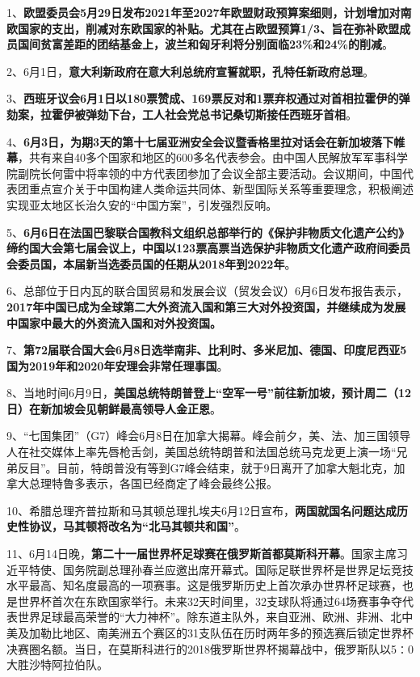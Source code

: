 1、{\textbf{欧盟委员会5月29日发布2021年至2027年欧盟财政预算案细则，计划增加对南欧国家的支出，削减对东欧国家的补贴。尤其在占欧盟预算1/3、旨在弥补欧盟成员国间贫富差距的团结基金上，波兰和匈牙利将分别面临23\%和24\%的削减}}。

2、6月1日，{\textbf{意大利新政府在意大利总统府宣誓就职，孔特任新政府总理}}。

3、{\textbf{西班牙议会6月1日以180票赞成、169票反对和1票弃权通过对首相拉霍伊的弹劾案，拉霍伊被弹劾下台，工人社会党总书记桑切斯接任西班牙首相}}。

4、{\textbf{6月3日，为期3天的第十七届亚洲安全会议暨香格里拉对话会在新加坡落下帷幕}}，共有来自40多个国家和地区的600多名代表参会。由中国人民解放军军事科学院副院长何雷中将率领的中方代表团参加了会议全部主要活动。会议期间，中国代表团重点宣介关于中国构建人类命运共同体、新型国际关系等重要理念，积极阐述实现亚太地区长治久安的``中国方案''，引发强烈反响。

5、{\textbf{6月6日在法国巴黎联合国教科文组织总部举行的《保护非物质文化遗产公约》缔约国大会第七届会议上，中国以123票高票当选保护非物质文化遗产政府间委员会委员国，本届新当选委员国的任期从2018年到2022年}}。

6、总部位于日内瓦的联合国贸易和发展会议（贸发会议）6月6日发布报告表示，{\textbf{2017年中国已成为全球第二大外资流入国和第三大对外投资国，并继续成为发展中国家中最大的外资流入国和对外投资国。}}

7、\textbf{{第72届联合国大会6月8日选举南非、比利时、多米尼加、德国、印度尼西亚5国为2019年和2020年安理会非常任理事国}}。

8、当地时间6月9日，\textbf{{美国总统特朗普登上``空军一号''前往新加坡，预计周二（12日）在新加坡会见朝鲜最高领导人金正恩}}。

9、``七国集团''（G7）峰会6月8日在加拿大揭幕。峰会前夕，美、法、加三国领导人在社交媒体上率先唇枪舌剑，美国总统特朗普和法国总统马克龙更上演一场``兄弟反目''。目前，特朗普没有等到G7峰会结束，就于9日离开了加拿大魁北克，加拿大总理特鲁多表示，各国已经商定了峰会最终公报。

10、希腊总理齐普拉斯和马其顿总理扎埃夫6月12日宣布，{\textbf{两国就国名问题达成历史性协议，马其顿将改名为``北马其顿共和国''}}。

11、6月14日晚，{\textbf{第二十一届世界杯足球赛在俄罗斯首都莫斯科开幕}}。国家主席习近平特使、国务院副总理孙春兰应邀出席开幕式。国际足联世界杯是世界足坛竞技水平最高、知名度最高的一项赛事。这是俄罗斯历史上首次承办世界杯足球赛，也是世界杯首次在东欧国家举行。未来32天时间里，32支球队将通过64场赛事争夺代表世界足球最高荣誉的``大力神杯''。除东道主队外，来自亚洲、欧洲、非洲、北中美及加勒比地区、南美洲五个赛区的31支队伍在历时两年多的预选赛后锁定世界杯决赛圈名额。当日，在莫斯科进行的2018俄罗斯世界杯揭幕战中，俄罗斯队以5∶0大胜沙特阿拉伯队。

